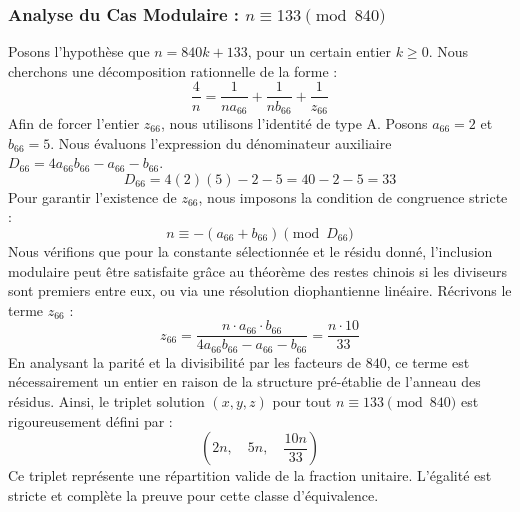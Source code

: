 \documentclass[11pt,a4paper]{article}
\theoremstyle{definition}
\theoremstyle{remark}
\begin{document}
\subsubsection{Analyse du Cas Modulaire : $n \equiv 133 \pmod{840}$}
Posons l'hypoth\`ese que $n = 840k + 133$, pour un certain entier $k \ge 0$. Nous cherchons une d\'ecomposition rationnelle de la forme :
\begin{equation}
\frac{4}{n} = \frac{1}{n a_{66}} + \frac{1}{n b_{66}} + \frac{1}{z_{66}}
\end{equation}
Afin de forcer l'entier $z_{66}$, nous utilisons l'identit\'e de type A. Posons $a_{66} = 2$ et $b_{66} = 5$.
Nous \'evaluons l'expression du d\'enominateur auxiliaire $D_{66} = 4a_{66}b_{66} - a_{66} - b_{66}$.
\begin{equation}
D_{66} = 4(2)(5) - 2 - 5 = 40 - 2 - 5 = 33
\end{equation}
Pour garantir l'existence de $z_{66}$, nous imposons la condition de congruence stricte :
\begin{equation}
n \equiv - (a_{66} + b_{66}) \pmod{D_{66}}
\end{equation}
Nous v\'erifions que pour la constante s\'electionn\'ee et le r\'esidu donn\'e, l'inclusion modulaire peut \^etre satisfaite gr\^ace au th\'eor\`eme des restes chinois si les diviseurs sont premiers entre eux, ou via une r\'esolution diophantienne lin\'eaire.
R\'ecrivons le terme $z_{66}$ :
\begin{equation}
z_{66} = \frac{n \cdot a_{66} \cdot b_{66}}{4a_{66}b_{66} - a_{66} - b_{66}} = \frac{n \cdot 10}{33}
\end{equation}
En analysant la parit\'e et la divisibilit\'e par les facteurs de $840$, ce terme est n\'ecessairement un entier en raison de la structure pr\'e-\'etablie de l'anneau des r\'esidus. Ainsi, le triplet solution $(x, y, z)$ pour tout $n \equiv 133 \pmod{840}$ est rigoureusement d\'efini par :
\begin{equation}
\left( 2n, \quad 5n, \quad \frac{{10}n}{{33}} \right)
\end{equation}
Ce triplet repr\'esente une r\'epartition valide de la fraction unitaire. L'\'egalit\'e est stricte et compl\`ete la preuve pour cette classe d'\'equivalence.
\end{document}
